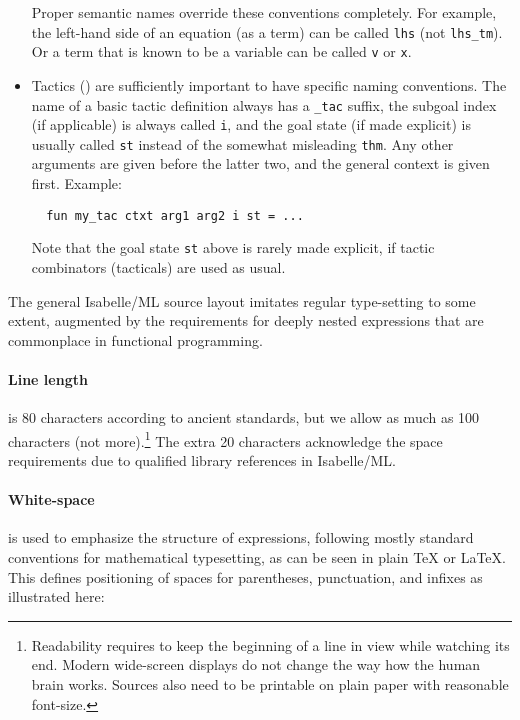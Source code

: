 \begin{isabellebody}
\begin{isamarkuptext}
\begin{itemize}
\begin{itemize}
  \end{itemize}

  Proper semantic names override these conventions completely.  For
  example, the left-hand side of an equation (as a term) can be called
  \verb|lhs| (not \verb|lhs_tm|).  Or a term that is known
  to be a variable can be called \verb|v| or \verb|x|.

  \item Tactics () are sufficiently important to
  have specific naming conventions.  The name of a basic tactic
  definition always has a \verb|_tac| suffix, the subgoal index
  (if applicable) is always called \verb|i|, and the goal state
  (if made explicit) is usually called \verb|st| instead of the
  somewhat misleading \verb|thm|.  Any other arguments are given
  before the latter two, and the general context is given first.
  Example:

  \begin{verbatim}
  fun my_tac ctxt arg1 arg2 i st = ...
  \end{verbatim}

  Note that the goal state \verb|st| above is rarely made
  explicit, if tactic combinators (tacticals) are used as usual.

  \end{itemize}%
\end{isamarkuptext}%
\isamarkuptrue%
%
\isamarkuptrue%
%
\begin{isamarkuptext}%
The general Isabelle/ML source layout imitates regular
  type-setting to some extent, augmented by the requirements for
  deeply nested expressions that are commonplace in functional
  programming.

  \paragraph{Line length} is 80 characters according to ancient
  standards, but we allow as much as 100 characters (not
  more).\footnote{Readability requires to keep the beginning of a line
  in view while watching its end.  Modern wide-screen displays do not
  change the way how the human brain works.  Sources also need to be
  printable on plain paper with reasonable font-size.} The extra 20
  characters acknowledge the space requirements due to qualified
  library references in Isabelle/ML.

  \paragraph{White-space} is used to emphasize the structure of
  expressions, following mostly standard conventions for mathematical
  typesetting, as can be seen in plain {\TeX} or {\LaTeX}.  This
  defines positioning of spaces for parentheses, punctuation, and
  infixes as illustrated here:


\end{isamarkuptext}
\end{isabellebody}
